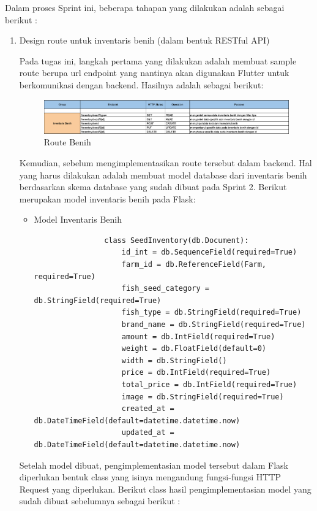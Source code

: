\begin{spacing}{1.5}
	Dalam proses Sprint ini, beberapa tahapan yang dilakukan adalah sebagai berikut :

	\begin{enumerate}
		\item Design route untuk inventaris benih (dalam bentuk RESTful API)
		
		Pada tugas ini, langkah pertama yang dilakukan adalah membuat sample route berupa url endpoint yang nantinya akan digunakan Flutter untuk berkomunikasi dengan backend. Hasilnya adalah sebagai berikut:

		\begin{figure}[H]
			\centering
			\includegraphics[width=1\textwidth]{gambar/sprint3/benih_route.png}
			\caption{Route Benih}
		\end{figure}

		Kemudian, sebelum mengimplementasikan route tersebut dalam backend. Hal yang harus dilakukan adalah membuat model database dari inventaris benih berdasarkan skema database yang sudah dibuat pada Sprint 2. Berikut merupakan model inventaris benih pada Flask:

		\begin{itemize}
			\item Model Inventaris Benih
			\begin{lstlisting}
				class SeedInventory(db.Document):
					id_int = db.SequenceField(required=True)
					farm_id = db.ReferenceField(Farm, required=True)
					fish_seed_category = db.StringField(required=True)
					fish_type = db.StringField(required=True)
					brand_name = db.StringField(required=True)
					amount = db.IntField(required=True)
					weight = db.FloatField(default=0)
					width = db.StringField()
					price = db.IntField(required=True)
					total_price = db.IntField(required=True)
					image = db.StringField(required=True)
					created_at = db.DateTimeField(default=datetime.datetime.now)
					updated_at = db.DateTimeField(default=datetime.datetime.now)
			\end{lstlisting}
		\end{itemize}

		Setelah model dibuat, pengimplementasian model tersebut dalam Flask diperlukan bentuk class yang isinya mengandung fungsi-fungsi HTTP Request yang diperlukan. Berikut class hasil pengimplementasian model yang sudah dibuat sebelumnya sebagai berikut :


\end{enumerate}
\end{spacing}
